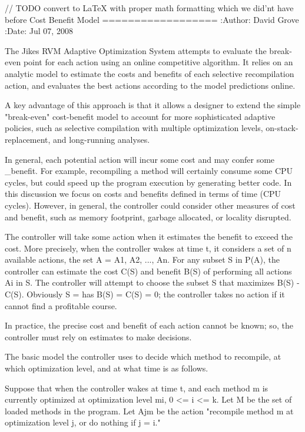 // TODO convert to LaTeX with proper math formatting which we did'nt have before
Cost Benefit Model
==================
:Author: David Grove
:Date: Jul 07, 2008

The Jikes RVM Adaptive Optimization System attempts to evaluate the break-even point for each action using an online competitive algorithm.  It relies on an analytic model to estimate the costs and benefits of each selective recompilation action, and evaluates the best actions according to the model predictions online.

A key advantage of this approach is that it allows a designer to extend the simple "break-even" cost-benefit model to account for more sophisticated adaptive policies, such as selective compilation with multiple optimization levels, on-stack-replacement, and long-running analyses.

In general, each potential action will incur some cost and may confer some _benefit. For example, recompiling a method will certainly consume some CPU cycles, but could speed up the program execution by generating better code. In this discussion we focus on costs and benefits defined in terms of time (CPU cycles). However, in general, the controller could consider other measures of cost and benefit, such as memory footprint, garbage allocated, or locality disrupted.

The controller will take some action when it estimates the benefit to exceed the cost. More precisely, when the controller wakes at time t, it considers a set of n available actions, the set A = {A1, A2, ..., An}. For any subset S in P(A), the controller can estimate the cost C(S) and benefit B(S) of performing all actions Ai in S. The controller will attempt to choose the subset S that maximizes B(S) - C(S). Obviously S = {} has B(S) = C(S) = 0; the controller takes no action if it cannot find a profitable course.

In practice, the precise cost and benefit of each action cannot be known; so, the controller must rely on estimates to make decisions.

The basic model the controller uses to decide which method to recompile, at which optimization level, and at what time is as follows.

Suppose that when the controller wakes at time t, and each method m is currently optimized at optimization level mi, 0 <= i <= k. Let M be the set of loaded methods in the program. Let Ajm be the action "recompile method m at optimization level j, or do nothing if j = i."

